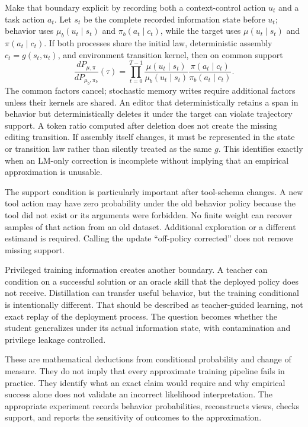 Make that boundary explicit by recording both a context-control action $u_t$ and a task action $a_t$. Let $s_t$ be the complete recorded information state before $u_t$; behavior uses $\mu_b(u_t\mid s_t)$ and $\pi_b(a_t\mid c_t)$, while the target uses $\mu(u_t\mid s_t)$ and $\pi(a_t\mid c_t)$. If both processes share the initial law, deterministic assembly $c_t=g(s_t,u_t)$, and environment transition kernel, then on common support
\begin{equation}
 \frac{dP_{\mu,\pi}}{dP_{\mu_b,\pi_b}}(\tau)
 =\prod_{t=0}^{T-1}
 \frac{\mu(u_t\mid s_t)}{\mu_b(u_t\mid s_t)}
 \frac{\pi(a_t\mid c_t)}{\pi_b(a_t\mid c_t)}.
\end{equation}
The common factors cancel; stochastic memory writes require additional factors unless their kernels are shared. An editor that deterministically retains a span in behavior but deterministically deletes it under the target can violate trajectory support. A token ratio computed after deletion does not create the missing editing transition. If assembly itself changes, it must be represented in the state or transition law rather than silently treated as the same $g$. This identifies exactly when an LM-only correction is incomplete without implying that an empirical approximation is unusable.

The support condition is particularly important after tool-schema changes. A new tool action may have zero probability under the old behavior policy because the tool did not exist or its arguments were forbidden. No finite weight can recover samples of that action from an old dataset. Additional exploration or a different estimand is required. Calling the update ``off-policy corrected'' does not remove missing support.

Privileged training information creates another boundary. A teacher can condition on a successful solution or an oracle skill that the deployed policy does not receive. Distillation can transfer useful behavior, but the training conditional is intentionally different. That should be described as teacher-guided learning, not exact replay of the deployment process. The question becomes whether the student generalizes under its actual information state, with contamination and privilege leakage controlled.

These are mathematical deductions from conditional probability and change of measure. They do not imply that every approximate training pipeline fails in practice. They identify what an exact claim would require and why empirical success alone does not validate an incorrect likelihood interpretation. The appropriate experiment records behavior probabilities, reconstructs views, checks support, and reports the sensitivity of outcomes to the approximation.

